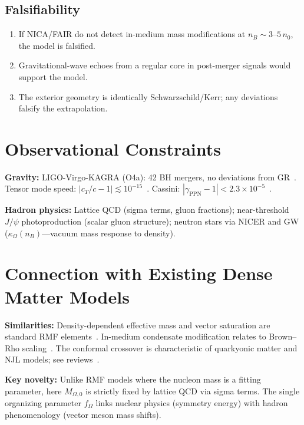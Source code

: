 \documentclass[11pt,a4paper]{article}
\begin{document}
\subsection{Falsifiability}

\begin{enumerate}
\item If NICA/FAIR do not detect in-medium mass modifications at $n_B \sim 3\text{--}5\,n_0$, the model is falsified.
\item Gravitational-wave echoes from a regular core in post-merger signals would support the model.
\item The exterior geometry is identically Schwarzschild/Kerr; any deviations falsify the extrapolation.
\end{enumerate}

\section{Observational Constraints}
\label{sec:obs}

\textbf{Gravity:}
LIGO-Virgo-KAGRA (O4a): 42 BH mergers, no deviations from GR~\cite{LVK2024}. Tensor mode speed: $|c_T/c - 1| \lesssim 10^{-15}$~\cite{Creminelli2017}. Cassini: $|\gamma_{\text{PPN}} - 1| < 2.3 \times 10^{-5}$~\cite{Cassini2003}.

\textbf{Hadron physics:}
Lattice QCD (sigma terms, gluon fractions); near-threshold $J/\psi$ photoproduction (scalar gluon structure); neutron stars via NICER and GW ($\kappa_\Omega(n_B)$---vacuum mass response to density).

\section{Connection with Existing Dense Matter Models}
\label{sec:connection}

\textbf{Similarities:} Density-dependent effective mass and vector saturation are standard RMF elements~\cite{Walecka1974,Serot1986}. In-medium condensate modification relates to Brown--Rho scaling~\cite{BrownRho1991}. The conformal crossover is characteristic of quarkyonic matter and NJL models; see reviews~\cite{Lattimer2016,Drischler2021}.

\textbf{Key novelty:} Unlike RMF models where the nucleon mass is a fitting parameter, here $M_{\Omega,0}$ is strictly fixed by lattice QCD via sigma terms. The single organizing parameter $f_\Omega$ links nuclear physics (symmetry energy) with hadron phenomenology (vector meson mass shifts).
\end{document}
